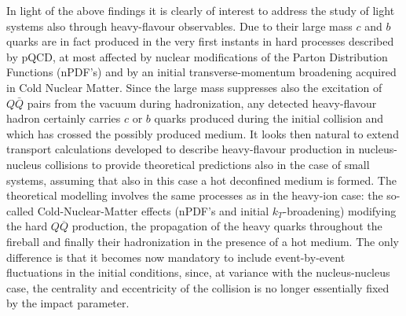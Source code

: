 In light of the above findings it is clearly of interest to address the study of light systems also through heavy-flavour observables. Due to their large mass $c$ and $b$ quarks are in fact produced in the very first instants in hard processes described by pQCD, at most affected by nuclear modifications of the Parton Distribution Functions (nPDF's) and by an initial transverse-momentum broadening acquired in Cold Nuclear Matter. Since the large mass suppresses also the excitation of $Q\bar Q$ pairs from the vacuum during hadronization, any detected heavy-flavour hadron certainly carries $c$ or $b$ quarks produced during the initial collision and which has crossed the possibly produced medium. It looks then natural to extend transport calculations developed to describe heavy-flavour production in nucleus-nucleus collisions to provide theoretical predictions also in the case of small systems, assuming that also in this case a hot deconfined medium is formed. The theoretical modelling involves the same processes as in the heavy-ion case: the so-called Cold-Nuclear-Matter effects (nPDF's and initial $k_T$-broadening) modifying the hard $Q\overline{Q}$ production, the propagation of the heavy quarks throughout the fireball and finally their hadronization in the presence of a hot medium. The only difference is that it becomes now mandatory to include event-by-event fluctuations in the initial conditions, since, at variance with the nucleus-nucleus case, the centrality and eccentricity of the collision is no longer essentially fixed by the impact parameter. 

